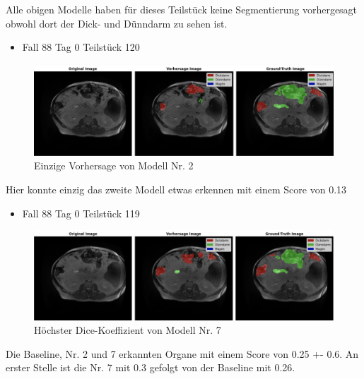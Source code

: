 Alle obigen Modelle haben für dieses Teilstück keine Segmentierung vorhergesagt obwohl dort der Dick- und Dünndarm zu sehen ist. 

\begin{itemize}
\item  Fall 88 Tag 0 Teilstück 120
\end{itemize}
\begin{figure}[H]
	\begin{center}
		\includegraphics[width=400pt]{LaTex/bilder/case88_day0_slice_0120_no2.png}
		\caption{ Einzige Vorhersage von Modell Nr. 2 }\label{Fig:7vs1}
	\end{center}
\end{figure}
Hier konnte einzig das zweite Modell etwas erkennen mit einem Score von 0.13

\begin{itemize}
\item Fall 88 Tag 0 Teilstück 119
\end{itemize}
\begin{figure}[H]
	\begin{center}
		\includegraphics[width=400pt]{LaTex/bilder/case88_day0_slice_0119_no7.png}
		\caption{ Höchster Dice-Koeffizient von Modell Nr. 7 }\label{Fig:7vs1}
	\end{center}
\end{figure}
Die Baseline, Nr. 2 und 7 erkannten Organe mit einem Score von 0.25 +- 0.6. An erster Stelle ist die Nr. 7 mit 0.3 gefolgt von der Baseline mit 0.26.

